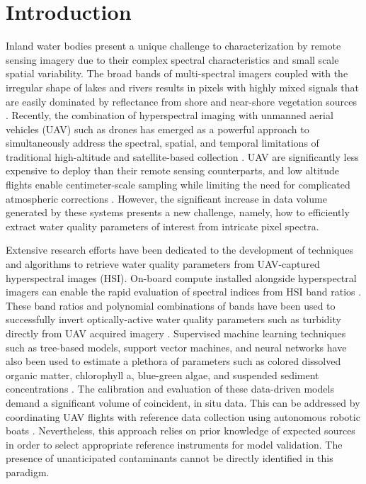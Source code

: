 \documentclass{article}
\begin{document}
\section{Introduction}

Inland water bodies present a unique challenge to characterization by remote sensing imagery due to their complex spectral characteristics and small scale spatial variability. The broad bands of multi-spectral imagers coupled with the irregular shape of lakes and rivers results in pixels with highly mixed signals that are easily dominated by reflectance from shore and near-shore vegetation sources \cite{koponen2002lake, ritchie2003remote}. Recently, the combination of hyperspectral imaging with unmanned aerial vehicles (UAV) such as drones has emerged as a powerful approach to simultaneously address the spectral, spatial, and temporal limitations of traditional high-altitude and satellite-based collection \cite{adao2017hyperspectral,arroyo2019implementation}. UAV are significantly less expensive to deploy than their remote sensing counterparts, and low altitude flights enable centimeter-scale sampling while limiting the need for complicated atmospheric corrections \cite{banerjee2020uav}. However, the significant increase in data volume generated by these systems presents a new challenge, namely, how to efficiently extract water quality parameters of interest from intricate pixel spectra.

Extensive research efforts have been dedicated to the development of techniques and algorithms to retrieve water quality parameters from UAV-captured hyperspectral images (HSI). On-board compute installed alongside hyperspectral imagers can enable the rapid evaluation of spectral indices from HSI band ratios \cite{horstrand2019uav}. These band ratios and polynomial combinations of bands have been used to successfully invert optically-active water quality parameters such as turbidity directly from UAV acquired imagery \cite{vogt2016near, zhang2022selection}. Supervised machine learning techniques such as tree-based models, support vector machines, and neural networks have also been used to estimate a plethora of parameters such as colored dissolved organic matter, chlorophyll a, blue-green algae, and suspended sediment concentrations \cite{keller2018hyperspectral, lu2021retrieval}. The calibration and evaluation of these data-driven models demand a significant volume of coincident, in situ data. This can be addressed by coordinating UAV flights with reference data collection using autonomous robotic boats \cite{robot-team-1, robot-team-2}. Nevertheless, this approach relies on prior knowledge of expected sources in order to select appropriate reference instruments for model validation. The presence of unanticipated contaminants cannot be directly identified in this paradigm. 
\end{document}
